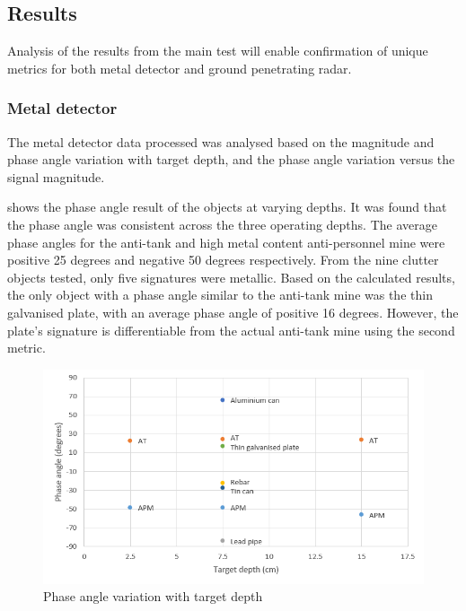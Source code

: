\documentclass[main.tex]{subfiles}
\begin{document}
\subsection{Results}
Analysis of the results from the main test will enable confirmation of unique metrics for both metal detector and ground penetrating radar.

\subsubsection{Metal detector}
The metal detector data processed was analysed based on the magnitude and phase angle variation with target depth, and the phase angle variation versus the signal magnitude.

 shows the phase angle result of the objects at varying depths. It was found that the phase angle was consistent across the three operating depths. The average phase angles for the anti-tank and high metal content anti-personnel mine were positive 25 degrees and negative 50 degrees respectively. From the nine clutter objects tested, only five signatures were metallic. Based on the calculated results, the only object with a phase angle similar to the anti-tank mine was the thin galvanised plate, with an average phase angle of positive 16 degrees. However, the plate’s signature is differentiable from the actual anti-tank mine using the second metric. 
\begin{figure}[ht]
\includegraphics[width=\textwidth]{5-Testing/phaseDepth.PNG}
\centering
\caption{Phase angle variation with target depth }
\end{figure}
\end{document}
